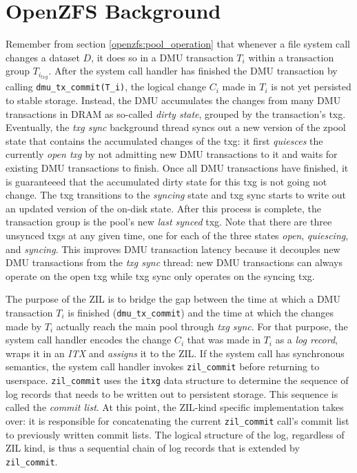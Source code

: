 \documentclass[12pt,a4paper,twoside]{book}
\begin{document}
\section{OpenZFS Background} \label{di:prb:background}
Remember from section \ref{openzfs:pool_operation} that whenever a file system call changes a dataset $D$, it does so in a DMU transaction $T_i$ within a transaction group $T_{i_{txg}}$.
After the system call handler has finished the DMU transaction by calling \lstinline{dmu_tx_commit(T_i)}, the logical change $C_i$ made in $T_i$ is not yet persisted to stable storage.
Instead, the DMU accumulates the changes from many DMU transactions in DRAM as so-called \textit{dirty state}, grouped by the transaction's txg.
Eventually, the \textit{txg sync} background thread syncs out a new version of the zpool state that contains the accumulated changes of the txg:
it first \textit{quiesces} the currently \textit{open txg} by not admitting new DMU transactions to it and waits for existing DMU transactions to finish.
Once all DMU transactions have finished, it is guaranteeed that the accumulated dirty state for this txg is not going not change.
The txg transitions to the \textit{syncing} state and txg sync starts to write out an updated version of the on-disk state.
After this process is complete, the transaction group is the pool's new \textit{last synced} txg.
Note that there are three unsynced txgs at any given time, one for each of the three states \textit{open}, \textit{quiescing}, and \textit{syncing}.
This improves DMU transaction latency because it decouples new DMU transactions from the \textit{txg sync} thread:
new DMU transactions can always operate on the open txg while txg sync only operates on the syncing txg.

The purpose of the ZIL is to bridge the gap between the time at which a DMU transaction $T_i$ is finished (\lstinline{dmu_tx_commit}) and the time at which the changes made by $T_i$ actually reach the main pool through \textit{txg sync}.
For that purpose, the system call handler encodes the change $C_i$ that was made in $T_i$ as a \textit{log record}, wraps it in an \textit{ITX} and \textit{assigns} it to the ZIL.
If the system call has synchronous semantics, the system call handler invokes \lstinline{zil_commit} before returning to userspace.
\lstinline{zil_commit} uses the \lstinline{itxg} data structure to determine the sequence of log records that needs to be written out to persistent storage.
This sequence is called the \textit{commit list}.
At this point, the ZIL-kind specific implementation takes over: it is responsible for concatenating the current \lstinline{zil_commit} call's commit list to previously written commit lists.
The logical structure of the log, regardless of ZIL kind, is thus a sequential chain of log records that is extended by \lstinline{zil_commit}.
\end{document}
